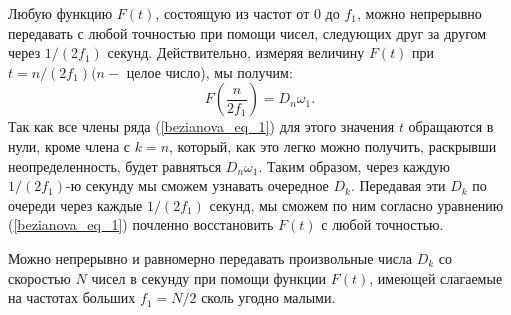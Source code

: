 \begin{theorem}\label{bezianova_theor_2} Любую функцию $F(t)$, состоящую из частот от 0 до $f_1$, можно непрерывно передавать с любой точностью при помощи чисел, следующих друг за другом через $1 /\left(2 f_1\right)$ секунд. Действительно, измеряя величину $F(t)$ при $t=n /\left(2 f_1\right)(n-$ целое число), мы получим:
\begin{equation}\label{bezianova_eq_8}
F\left(\frac{n}{2 f_1}\right)=D_n \omega_1.
\end{equation}
\qquad Так как все члены ряда (\ref{bezianova_eq_1}) для этого значения $t$ обращаются в нули, кроме члена с $k=n$, который, как это легко можно получить, раскрывши неопределенность, будет равняться $D_n \omega_1$. Таким образом, через каждую $1/\left(2 f_1\right)$-ю секунду мы сможем узнавать очередное $D_k$. Передавая эти $D_k$ по очереди через каждые $1/\left(2f_1\right)$ секунд, мы сможем по ним согласно уравнению (\ref{bezianova_eq_1}) почленно восстановить $F(t)$ с любой точностью.
\end{theorem}

\begin{theorem}\label{bezianova_theor_3} Можно непрерывно и равномерно передавать произвольные числа $D_k$ со скоростью $N$ чисел в секунду при помощи функции $F(t)$, имеющей слагаемые на частотах больших $f_1=N / 2$ сколь угодно малыми.
	\end{theorem}

